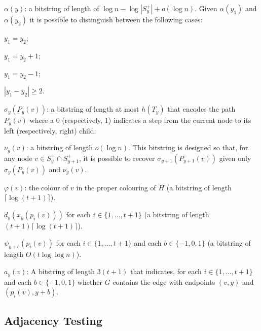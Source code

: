 \documentclass{article}
\begin{document}
\begin{compactenum}[(L1)]
    \item $\alpha(y)$: a bitstring of length of $\log n-\log |S^+_y|+o(\log n)$.  Given $\alpha(y_1)$ and $\alpha(y_2)$ it is possible to distinguish between the following cases:
    \begin{inparaenum}
        \item $y_1=y_2$;
        \item $y_1=y_2+1$;
        \item $y_1=y_2-1$;
        \item $|y_1-y_2|\ge 2$.
    \end{inparaenum}

    \item $\sigma_y(P_y(v))$: a bitstring of length at most $h(T_y)$ that encodes the path $P_y(v)$ where a 0 (respectively, 1) indicates a step from the current node to its left (respectively, right) child.

    \item $\nu_y(v)$: a bitstring of length $o(\log n)$.  This bitstring is designed so that, for any node $v\in S^+_y\cap S^+_{y+1}$, it is possible to recover $\sigma_{y+1}(P_{y+1}(v))$ given only $\sigma_y(P_y(v))$ and $\nu_y(v)$.

    \item $\varphi(v)$: the colour of $v$ in the proper colouring of $H$ (a bitstring of length $\lceil\log(t+1)\rceil$).

    \item $d_y(x_y(p_i(v)))$ for each $i\in\{1,\ldots,t+1\}$ (a bitstring of length $(t+1)\lceil\log(t+1)\rceil$).

    \item $\psi_{y+b}(p_i(v))$ for each $i\in\{1,\ldots,t+1\}$ and each $b\in\{-1,0,1\}$ (a bitstring of length $O(t\log\log n)$).\label{psi}

    \item $a_y(v)$: A bitstring of length $3(t+1)$ that indicates, for each $i\in\{1,\ldots,t+1\}$ and each $b\in\{-1,0,1\}$ whether $G$ contains the edge with endpoints $(v,y)$ and $(p_i(v),y+b)$.
\end{compactenum}

\subsection{Adjacency Testing}
\end{document}
